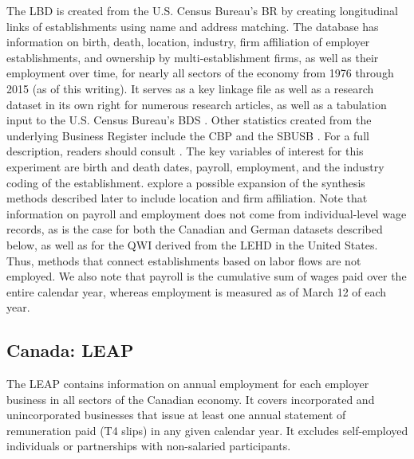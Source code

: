 \documentclass[10pt,twoside]{article}
\begin{document}
The \ac{LBD} \citep{LBD} is created from the U.S. Census Bureau's \ac{BR} by creating longitudinal links of establishments using name and address matching. The database has information on birth, death, location, industry,  firm  affiliation of employer establishments, and ownership by multi-establishment firms, as well as their employment over time, for nearly all sectors of the economy from 1976 through 2015 (as of this writing). It serves as a key linkage file as well as a research dataset in its own right for numerous research articles, as well as a tabulation input to the U.S. Census Bureau's \acl{BDS} \citep[\acs{BDS}]{BDS}. Other statistics created from the underlying Business Register include the \acl{CBP} \citep[\acs{CBP}]{CBP} and the \acl{SBUSB} \citep[\acs{SBUSB}]{SBUSB}. For a full description, readers should consult  \citet{RePEc:cen:wpaper:02-17,}. The key variables of interest for this experiment are birth and death dates, payroll, employment, and the industry coding of the establishment.  \citet{SJIAOS-2014d} explore a possible expansion of the synthesis methods described later to include location and firm affiliation. Note that information on payroll and employment does not come from individual-level wage records, as is the case for both the Canadian and German datasets described below, as well as for the \acl{QWI} \citep{AbowdEtAl2009} derived from the \acl{LEHD} \citep[LEHD]{RePEc:cen:wpaper:18-27} in the United States. Thus, methods that connect establishments based on labor flows \citep{BenedettoEtAl2007,RePEc:iab:iabfme:201006_en} are not employed. We also note that payroll is the cumulative sum of wages paid over the entire calendar year, whereas employment is measured as of March 12 of each year.









 
\subsection{Canada: \acf{LEAP}}


The \ac{LEAP} \citep{StatisticsCanada2019} contains information on annual employment for each employer business in all sectors of the Canadian economy. It covers incorporated and unincorporated businesses that issue at least one annual statement of remuneration paid (T4 slips) in any given calendar year. It excludes self-employed individuals or partnerships with non-salaried participants.
\end{document}
